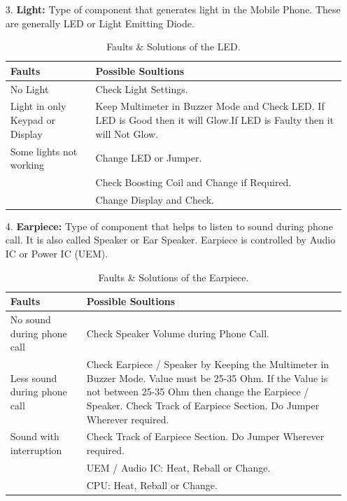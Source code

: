 \begin{itemize}
\item[3.] \textbf{Light:} Type of component that generates light in the Mobile Phone. These are generally LED or Light Emitting Diode.
\begin{table}[!ht]
\centering
\begin{tabular}{|p{2.5in}|p{3.5in}|}
\hline
\textbf{Faults} & \textbf{Possible Soultions} \\ \hline
No Light & Check Light Settings.\\ 
Light in only Keypad or Display & Keep Multimeter in Buzzer Mode and Check LED. If LED is Good then it will Glow.If LED is Faulty then it will Not Glow. \\ 
Some lights not working & Change LED or Jumper.\\ 
                & Check Boosting Coil and Change if Required.\\
                & Change Display and Check.\\
\hline
\end{tabular}
\caption{Faults \& Solutions of the LED.}
\end{table}

\newpage
\item[4.] \textbf{Earpiece:} Type of component that helps to listen to sound during phone call. It is also called Speaker or Ear Speaker. Earpiece is controlled by Audio IC or Power IC (UEM).
\begin{table}[!ht]
\centering
\begin{tabular}{|p{2.5in}|p{3.5in}|}
\hline
\textbf{Faults} & \textbf{Possible Soultions} \\ \hline
No sound during phone call & Check Speaker Volume during Phone Call.\\ 
Less sound during phone call & Check Earpiece / Speaker by Keeping the Multimeter in Buzzer Mode. Value must be 25-35 Ohm. If the Value is not between 25-35 Ohm then change the Earpiece / Speaker.
Check Track of Earpiece Section. Do Jumper Wherever required. \\ 
Sound with interruption & Check Track of Earpiece Section. Do Jumper Wherever required.\\ 
                & UEM / Audio IC: Heat, Reball or Change.\\
                & CPU: Heat, Reball or Change.\\
\hline
\end{tabular}
\caption{Faults \& Solutions of the Earpiece.}
\end{table}


\end{itemize}
